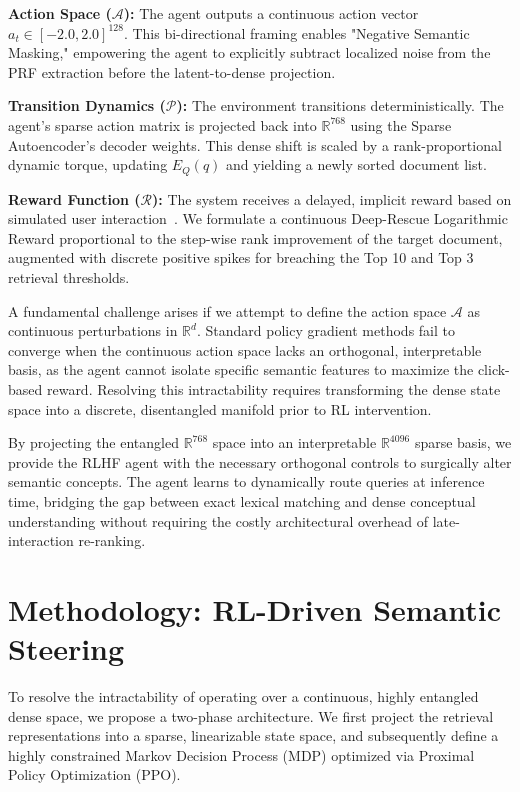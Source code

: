 \textbf{Action Space ($\mathcal{A}$):} The agent outputs a continuous action vector $a_t \in [-2.0, 2.0]^{128}$. This bi-directional framing enables "Negative Semantic Masking," empowering the agent to explicitly subtract localized noise from the PRF extraction before the latent-to-dense projection.

\textbf{Transition Dynamics ($\mathcal{P}$):} The environment transitions deterministically. The agent's sparse action matrix is projected back into $\mathbb{R}^{768}$ using the Sparse Autoencoder's decoder weights. This dense shift is scaled by a rank-proportional dynamic torque, updating $E_Q(q)$ and yielding a newly sorted document list.

\textbf{Reward Function ($\mathcal{R}$):} The system receives a delayed, implicit reward based on simulated user interaction~\citep{joachims2002}. We formulate a continuous Deep-Rescue Logarithmic Reward proportional to the step-wise rank improvement of the target document, augmented with discrete positive spikes for breaching the Top 10 and Top 3 retrieval thresholds.

A fundamental challenge arises if we attempt to define the action space $\mathcal{A}$ as continuous perturbations in $\mathbb{R}^d$. Standard policy gradient methods fail to converge when the continuous action space lacks an orthogonal, interpretable basis, as the agent cannot isolate specific semantic features to maximize the click-based reward. Resolving this intractability requires transforming the dense state space into a discrete, disentangled manifold prior to RL intervention.

By projecting the entangled $\mathbb{R}^{768}$ space into an interpretable $\mathbb{R}^{4096}$ sparse basis, we provide the RLHF agent with the necessary orthogonal controls to surgically alter semantic concepts. The agent learns to dynamically route queries at inference time, bridging the gap between exact lexical matching and dense conceptual understanding without requiring the costly architectural overhead of late-interaction re-ranking.

\section{Methodology: RL-Driven Semantic Steering}
To resolve the intractability of operating over a continuous, highly entangled dense space, we propose a two-phase architecture. We first project the retrieval representations into a sparse, linearizable state space, and subsequently define a highly constrained Markov Decision Process (MDP) optimized via Proximal Policy Optimization (PPO).

